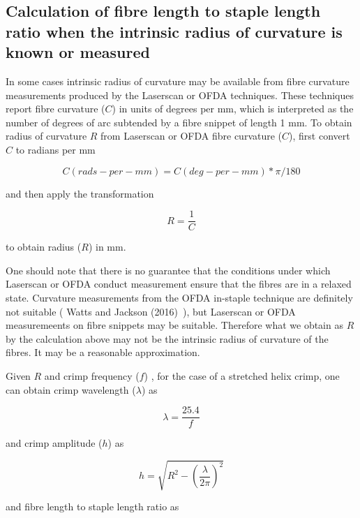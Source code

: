 \documentclass[titlepage,10pt]{article}  %
\begin{document}




\subsection{Calculation of fibre length to staple length ratio when the intrinsic radius of curvature is known or measured}
\label{sec:calcr}
In some cases intrinsic radius of curvature may be available from fibre curvature measurements produced by the Laserscan or OFDA techniques. These techniques report fibre curvature ($C$) in units of degrees per mm, which is interpreted as the number of degrees of arc subtended by a fibre snippet of length 1 mm. To obtain radius of curvature $R$ from Laserscan or OFDA fibre curvature ($C$), first convert $C$ to radians per mm

\begin{displaymath}
C (rads-per-mm) = C (deg-per-mm) * \pi / 180
\end{displaymath}

and then apply the transformation

\begin{displaymath}
R = \frac{1}{C}
\end{displaymath}
 
to obtain radius ($R$) in mm.

One should note that there is no guarantee that the conditions under which Laserscan or OFDA conduct measurement ensure that the fibres are in a relaxed state. Curvature measurements from the OFDA in-staple technique are definitely not suitable ( Watts and Jackson (2016)~\cite{watt:16}), but Laserscan or OFDA measuremeents on fibre snippets may be suitable. Therefore what we obtain as $R$ by the calculation above may not be the intrinsic radius of curvature of the fibres. It may be a reasonable approximation.

Given $R$ and crimp frequency ($f$) , for the case of a stretched helix crimp,  one can obtain crimp wavelength ($\lambda$) as

\begin{equation}
\lambda  =  \frac{25.4}{f}
\end{equation}

and crimp amplitude ($h$) as

\begin{equation}
h   =  \sqrt{R^{2} - \left(\frac{\lambda}{2\pi}\right)^{2}}
\end{equation}

and fibre length to staple length ratio as 
\end{document}
